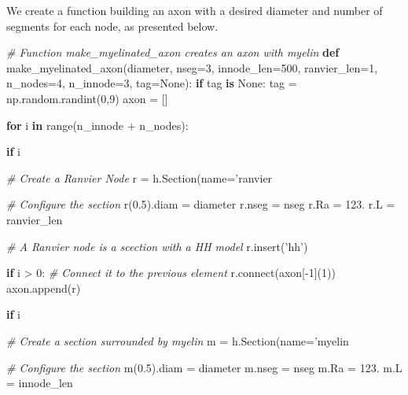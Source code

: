 \documentclass[]{article}
\newenvironment{Shaded}{}{}
\newcommand{\BuiltInTok}[1]{#1}
\newcommand{\CommentTok}[1]{\textcolor[rgb]{0.38,0.63,0.69}{\textit{#1}}}
\newcommand{\ControlFlowTok}[1]{\textcolor[rgb]{0.00,0.44,0.13}{\textbf{#1}}}
\newcommand{\DecValTok}[1]{\textcolor[rgb]{0.25,0.63,0.44}{#1}}
\newcommand{\ExtensionTok}[1]{#1}
\newcommand{\FloatTok}[1]{\textcolor[rgb]{0.25,0.63,0.44}{#1}}
\newcommand{\KeywordTok}[1]{\textcolor[rgb]{0.00,0.44,0.13}{\textbf{#1}}}
\newcommand{\NormalTok}[1]{#1}
\newcommand{\OperatorTok}[1]{\textcolor[rgb]{0.40,0.40,0.40}{#1}}
\newcommand{\SpecialCharTok}[1]{\textcolor[rgb]{0.25,0.44,0.63}{#1}}
\newcommand{\StringTok}[1]{\textcolor[rgb]{0.25,0.44,0.63}{#1}}
\newcommand{\VariableTok}[1]{\textcolor[rgb]{0.10,0.09,0.49}{#1}}
\begin{document}
We create a function building an axon with a desired diameter and number
of segments for each node, as presented below.

\begin{Shaded}
\begin{Highlighting}[]
\CommentTok{# Function make_myelinated_axon creates an axon with myelin}
\KeywordTok{def}\NormalTok{ make_myelinated_axon(diameter, nseg}\OperatorTok{=}\DecValTok{3}\NormalTok{, innode_len}\OperatorTok{=}\DecValTok{500}\NormalTok{, }
\NormalTok{        ranvier_len}\OperatorTok{=}\DecValTok{1}\NormalTok{, n_nodes}\OperatorTok{=}\DecValTok{4}\NormalTok{, n_innode}\OperatorTok{=}\DecValTok{3}\NormalTok{, tag}\OperatorTok{=}\VariableTok{None}\NormalTok{):}
    \ControlFlowTok{if}\NormalTok{ tag }\KeywordTok{is} \VariableTok{None}\NormalTok{: }
\NormalTok{        tag }\OperatorTok{=}\NormalTok{ np.random.randint(}\DecValTok{0}\NormalTok{,}\DecValTok{9}\NormalTok{)}
\NormalTok{    axon }\OperatorTok{=}\NormalTok{ []}
    
    \ControlFlowTok{for}\NormalTok{ i }\KeywordTok{in} \BuiltInTok{range}\NormalTok{(n_innode }\OperatorTok{+}\NormalTok{ n_nodes): }

        \ControlFlowTok{if}\NormalTok{ i }\OperatorTok{%} \DecValTok{2} \OperatorTok{==} \DecValTok{0}\NormalTok{: }
            \CommentTok{# Create a Ranvier Node }
\NormalTok{            r }\OperatorTok{=}\NormalTok{ h.Section(name}\OperatorTok{=}\StringTok{'ranvier}\SpecialCharTok{%d%d}\StringTok{'}\OperatorTok{%}\NormalTok{(tag,i))}
            \CommentTok{# Configure the section }
\NormalTok{            r(}\FloatTok{0.5}\NormalTok{).diam }\OperatorTok{=}\NormalTok{ diameter}
\NormalTok{            r.nseg }\OperatorTok{=}\NormalTok{ nseg}
\NormalTok{            r.Ra }\OperatorTok{=} \FloatTok{123.}
\NormalTok{            r.L }\OperatorTok{=}\NormalTok{ ranvier_len}

            \CommentTok{# A Ranvier node is a scection with a HH model}
\NormalTok{            r.insert(}\StringTok{'hh'}\NormalTok{)}

            \ControlFlowTok{if}\NormalTok{ i }\OperatorTok{>} \DecValTok{0}\NormalTok{: }
                \CommentTok{# Connect it to the previous element}
\NormalTok{                r.}\ExtensionTok{connect}\NormalTok{(axon[}\OperatorTok{-}\DecValTok{1}\NormalTok{](}\DecValTok{1}\NormalTok{))}
\NormalTok{            axon.append(r)}
            
        \ControlFlowTok{if}\NormalTok{ i }\OperatorTok{%} \DecValTok{2} \OperatorTok{==} \DecValTok{1}\NormalTok{: }
            \CommentTok{# Create a section surrounded by myelin }
\NormalTok{            m }\OperatorTok{=}\NormalTok{ h.Section(name}\OperatorTok{=}\StringTok{'myelin}\SpecialCharTok{%d%d}\StringTok{'}\OperatorTok{%}\NormalTok{(tag,i))}
            \CommentTok{# Configure the section }
\NormalTok{            m(}\FloatTok{0.5}\NormalTok{).diam }\OperatorTok{=}\NormalTok{ diameter}
\NormalTok{            m.nseg }\OperatorTok{=}\NormalTok{ nseg}
\NormalTok{            m.Ra }\OperatorTok{=} \FloatTok{123.}
\NormalTok{            m.L }\OperatorTok{=}\NormalTok{ innode_len}

}}}}
\end{Highlighting}
\end{Shaded}
\end{document}
